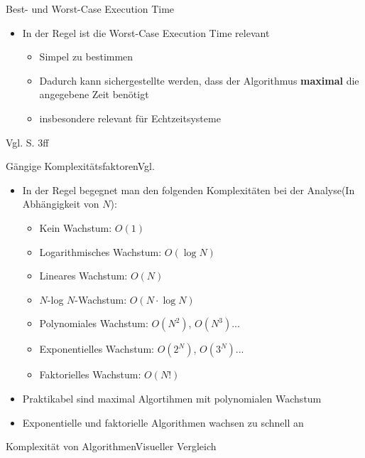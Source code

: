\begin{frame}{Best- und Worst-Case Execution Time}
    \begin{itemize}
        \item In der Regel ist die Worst-Case Execution Time relevant
        \begin{itemize}
            \item Simpel zu bestimmen
            \item Dadurch kann sichergestellte werden, dass der Algorithmus \textbf{maximal} die angegebene Zeit benötigt
            \item insbesondere relevant für Echtzeitsysteme
        \end{itemize}
    \end{itemize}
Vgl. \cite{ottmann2017} S. 3ff
\end{frame}

\begin{frame}{Gängige Komplexitätsfaktoren}{Vgl. \cite{ottmann2017}}
    \begin{itemize}[<+->]
        \item In der Regel begegnet man den folgenden Komplexitäten bei der Analyse(In Abhängigkeit von $N$):
        \begin{itemize}
            \item Kein Wachstum: $O(1)$
            \item Logarithmisches Wachstum: $O(\log N)$
            \item Lineares Wachstum: $O(N)$
            \item $N$-log $N$-Wachstum: $O(N\cdot\log N)$
            \item Polynomiales Wachstum: $O(N^2)$, $O(N^3)$...
            \item Exponentielles Wachstum: $O(2^N)$, $O(3^N)$...
            \item Faktorielles Wachstum: $O(N!)$
        \end{itemize}
        \item Praktikabel sind maximal Algortihmen mit polynomialen Wachstum
        \item Exponentielle und faktorielle Algorithmen wachsen zu schnell an
    \end{itemize}
\end{frame}

\begin{frame}{Komplexität von Algorithmen}{Visueller Vergleich}
\begin{figure}
\centering
{}
\end{figure}
\end{frame}

